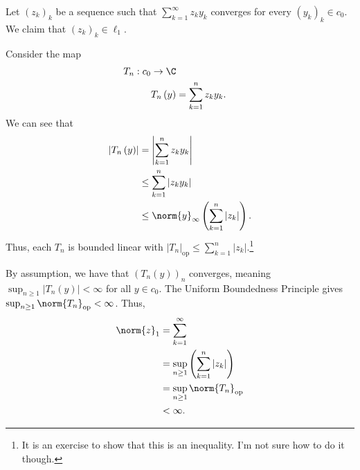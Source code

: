 \documentclass[10pt]{mypackage}
\begin{document}
  \begin{example}
    Let $\left(z_k\right)_k$ be a sequence such that $\sum_{k=1}^{\infty}z_ky_k$ converges for every $\left(y_k\right)_k\in c_0$. We claim that $\left(z_k\right)_k\in \ell_1$.\newline

    Consider the map
    \begin{align*}
      T_n: c_0\rightarrow \C\\
      T_n\left(y\right) &= \sum_{k=1}^{n}z_ky_k.
    \end{align*}
    We can see that
    \begin{align*}
      \left\vert T_n\left(y\right) \right\vert &= \left\vert \sum_{k=1}^{n}z_ky_k \right\vert\\
                                               &\leq \sum_{k=1}^{n}\left\vert z_ky_k \right\vert\\
                                               &\leq \norm{y}_{\infty}\left(\sum_{k=1}^{n}\left\vert z_k \right\vert\right).
    \end{align*}
    Thus, each $T_n$ is bounded linear with $\left\vert T_n \right\vert_{\text{op}}\leq \sum_{k=1}^{n}\left\vert z_k \right\vert$.\footnote{It is an exercise to show that this is an inequality. I'm not sure how to do it though.}\newline

    By assumption, we have that $\left(T_n\left(y\right)\right)_n$ converges, meaning $\sup_{n\geq 1}\left\vert T_n\left(y\right) \right\vert < \infty$ for all $y\in c_0$. The Uniform Boundedness Principle gives $\sup_{n\geq 1}\norm{T_n}_{\text{op}} < \infty$. Thus,
    \begin{align*}
      \norm{z}_1 &= \sum_{k=1}^{\infty}\\
                 &= \sup_{n\geq 1}\left(\sum_{k=1}^{n}\left\vert z_k \right\vert\right)\\
                 &= \sup_{n\geq 1}\norm{T_n}_{\text{op}}\\
                 &<\infty.
    \end{align*}
  \end{example}
\end{document}
